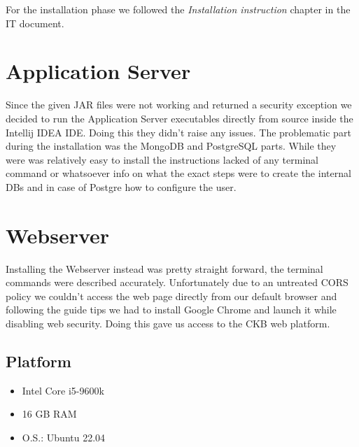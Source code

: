 For the installation phase we followed the \textit{Installation instruction} chapter in the IT document. 
\section{Application Server}
Since the given JAR files were not working and returned a security exception we decided to run the Application Server executables directly from source inside the Intellij IDEA IDE. Doing this they didn't raise any issues. The problematic part during the installation was the MongoDB and PostgreSQL parts. While they were was relatively easy to install the instructions lacked of any terminal command or whatsoever info on what the exact steps were to create the internal DBs and in case of Postgre how to configure the user. 

\section{Webserver}
Installing the Webserver instead was pretty straight forward, the terminal commands were described accurately. Unfortunately due to an untreated CORS policy we couldn't access the web page directly from our default browser and following the guide tips we had to install Google Chrome and launch it while disabling web security. Doing this gave us access to the \ac{CKB} web platform.\subsection{Platform}
\begin{itemize}
    \item Intel Core i5-9600k
    \item 16 GB RAM
    \item O.S.: Ubuntu 22.04
\end{itemize}